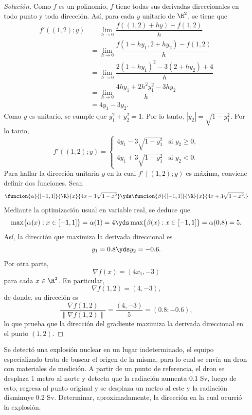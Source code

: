 \documentclass[a4,11pt]{aleph-notas}
\begin{document}
\begin{proof}[Solución]
Como $f$ es un polinomio, $f$ tiene todas sus derivadas direccionales en todo punto y toda dirección. Así, para cada $y$ unitario de $\R^2$, se tiene que
	\begin{align*}
		f'((1,2);y)
			&=\lim_{h\to 0}\dfrac{f((1,2)+hy)-f(1,2)}{h}    \\
			&=\lim_{h\to 0}\dfrac{f(1+hy_1,2+hy_2)-f(1,2)}{h}\\	
			&=\lim_{h\to 0}\dfrac{2(1+hy_1)^2-3(2+hy_2)+4}{h}    \\
	        &=\lim_{h\to 0}\dfrac{4hy_1+2h^2y_1^2-3hy_2}{h}    \\
			&=4y_1-3y_2.
	\end{align*}
    Como $y$ es unitario, se cumple que $y_1^2+y_2^2=1$. Por lo tanto, $|y_2|=\sqrt{1-y_1^2}$. Por lo tanto,
    \[
        f'((1,2);y)
        =\begin{cases}
            4y_1-3\sqrt{1-y_1^2}& \text{si }y_2\geq0,\\
            4y_1+3\sqrt{1-y_1^2}& \text{si }y_2<0.
        \end{cases}
    \]
    Para hallar la dirección unitaria $y$ en la cual $f'((1,2);y)$ es máxima, conviene definir dos funciones. Sean
    \[
        \funcion{\alpha}{[-1,1]}{\R}{x}{4x-3\sqrt{1-x^2}}
        \yds
        \funcion{\beta}{[-1,1]}{\R}{x}{4x+3\sqrt{1-x^2}.}
    \]
    Mediante la optimización usual en variable real, se deduce que
    \[
        \max\{\alpha(x):x\in[-1,1]\}=\alpha(1)=4
        \yds
        \max\{\beta(x):x\in[-1,1]\}=\alpha(0.8)=5.
    \]
    Así, la dirección que maximiza la derivada direccional es
    \[
        y_1=0.8
        \yds
        y_2=-0.6.
    \]
    Por otra parte,
    \[
        \nabla f(x)=(4x_1,-3)
    \]
    para cada $x\in\R^2$. En particular,
    \[
        \nabla f(1,2)=(4,-3),
    \]
    de donde, su dirección es
    \[
        \dfrac{\nabla f(1,2)}{\|\nabla f(1,2)\|}
        =\dfrac{(4,-3)}{5}
        =(0.8;-0.6),
    \]
	lo que prueba que la dirección del gradiente maximiza la derivada direccional en el punto $(1,2)$.
\end{proof}

\begin{ejer}
Se detectó una explosión nuclear en un lugar indeterminado, el equipo especializado trata de buscar el origen de la misma, para lo cual se envía un dron con materiales de medición. A partir de un punto de referencia, el dron se desplaza 1 metro al norte y detecta que la radiación aumenta 0.1 Sv, luego de esto, regresa al punto original y se desplaza un metro al este y la radiación disminuye 0.2 Sv. Determinar, aproximadamente, la dirección en la cual ocurrió la explosión.
\end{ejer}
\end{document}
